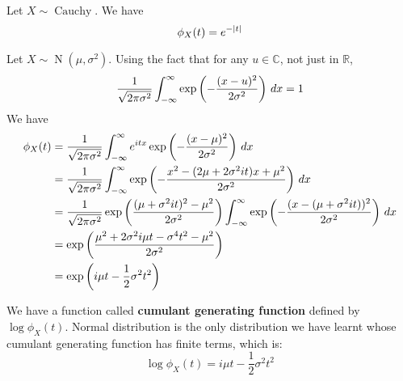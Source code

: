 \documentclass{huhtakm-template-book}
\DeclareMathOperator{\N}{N}
\DeclareMathOperator{\Cauchy}{Cauchy}
\begin{document}
\begin{eg}
    Let $X\sim\Cauchy$. We have
    \begin{equation*}
        \phi_{X}(t)=e^{-\left|{t}\right|}
    \end{equation*}
\end{eg}
\begin{eg}
    Let $X\sim\N(\mu,\sigma^{2})$. Using the fact that for any $u\in\mathbb{C}$, not just in $\mathbb{R}$,
    \begin{equation*}
        \frac{1}{\sqrt{2\pi\sigma^{2}}}\int_{-\infty}^{\infty}\exp\left(-\frac{(x-u)^{2}}{2\sigma^{2}}\right)\,dx=1
    \end{equation*}
    We have
    \begin{align*}
        \phi_{X}(t)&=\frac{1}{\sqrt{2\pi\sigma^{2}}}\int_{-\infty}^{\infty} e^{itx}\exp\left(-\frac{(x-\mu)^{2}}{2\sigma^{2}}\right)\,dx\\
        &=\frac{1}{\sqrt{2\pi\sigma^{2}}}\int_{-\infty}^{\infty}\exp\left(-\frac{x^{2}-(2\mu+2\sigma^{2}it)x+\mu^{2}}{2\sigma^{2}}\right)\,dx\\
        &=\frac{1}{\sqrt{2\pi\sigma^{2}}}\exp\left(\frac{(\mu+\sigma^{2}it)^{2}-\mu^{2}}{2\sigma^{2}}\right)\int_{-\infty}^{\infty}\exp\left(-\frac{(x-(\mu+\sigma^{2}it))^{2}}{2\sigma^{2}}\right)\,dx\\
        &=\exp\left(\frac{\mu^{2}+2\sigma^{2}i\mu t-\sigma^{4}t^{2}-\mu^{2}}{2\sigma^{2}}\right)\\
        &=\exp\left(i\mu t-\frac{1}{2}\sigma^{2}t^{2}\right)
    \end{align*}
\end{eg}
\begin{rem}
    We have a function called \textbf{cumulant generating function} defined by $\log\phi_{X}(t)$. Normal distribution is the only distribution we have learnt whose cumulant generating function has finite terms, which is:
    \begin{equation*}
        \log\phi_{X}(t)=i\mu t-\frac{1}{2}\sigma^{2}t^{2}
    \end{equation*}
\end{rem}
\newpage
\end{document}
